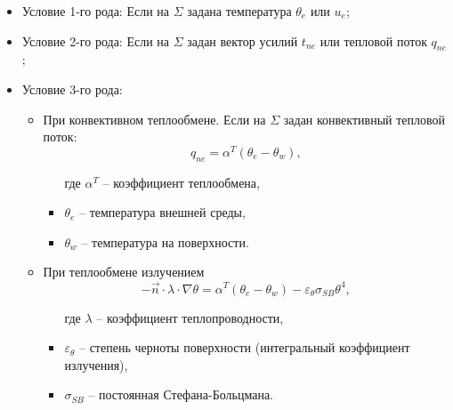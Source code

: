 \begin{itemize}
	\item Условие 1-го рода:
	Если на $\Sigma$ задана температура $\theta_e$ или $u_e$;
	\item Условие 2-го рода:
	Если на $\Sigma$ задан вектор усилий $t_{ne}$ или тепловой поток $q_{ne}$;
	\item Условие 3-го рода:
	\begin{itemize}
		\item При конвективном теплообмене. Если на $\Sigma$ задан конвективный тепловой поток:
		\[
			q_{ne} = \alpha^T\left(\theta_e-\theta_w\right),
		\]
		\begin{itemize}[label*=]
			\item[где] $\alpha^T$ -- коэффициент теплообмена,
			\item $\theta_e$ -- температура внешней среды,
			\item $\theta_w$ -- температура на поверхности.
		\end{itemize}
		\item При теплообмене излучением
		\[
			-\vec{n}\cdot\lambda\cdot\nabla\theta=\alpha^T\left(\theta_e-\theta_w\right)-\varepsilon_\theta\sigma_{SB}\theta^4,
		\]
		\begin{itemize}[label*=]
			\item[где] $\lambda$ -- коэффициент теплопроводности,
			\item $\varepsilon_\theta$ -- степень черноты поверхности (интегральный коэффициент излучения),
			\item $\sigma_{SB}$ -- постоянная Стефана-Больцмана.
		\end{itemize}
	\end{itemize}
\end{itemize}
